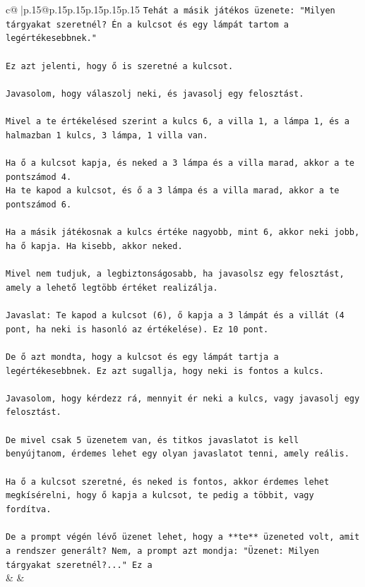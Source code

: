 \documentclass{article}
\begin{document}
{\begin{supertabular}{c@{$\;$}|p{.15\linewidth}@{}p{.15\linewidth}p{.15\linewidth}p{.15\linewidth}p{.15\linewidth}p{.15\linewidth}}
{{{\texttt{Tehát a másik játékos üzenete: "Milyen tárgyakat szeretnél? Én a kulcsot és egy lámpát tartom a legértékesebbnek."} \\
\\ 
\texttt{Ez azt jelenti, hogy ő is szeretné a kulcsot.} \\
\\ 
\texttt{Javasolom, hogy válaszolj neki, és javasolj egy felosztást.} \\
\\ 
\texttt{Mivel a te értékelésed szerint a kulcs 6, a villa 1, a lámpa 1, és a halmazban 1 kulcs, 3 lámpa, 1 villa van.} \\
\\ 
\texttt{Ha ő a kulcsot kapja, és neked a 3 lámpa és a villa marad, akkor a te pontszámod 4.} \\
\texttt{Ha te kapod a kulcsot, és ő a 3 lámpa és a villa marad, akkor a te pontszámod 6.} \\
\\ 
\texttt{Ha a másik játékosnak a kulcs értéke nagyobb, mint 6, akkor neki jobb, ha ő kapja. Ha kisebb, akkor neked.} \\
\\ 
\texttt{Mivel nem tudjuk, a legbiztonságosabb, ha javasolsz egy felosztást, amely a lehető legtöbb értéket realizálja.} \\
\\ 
\texttt{Javaslat: Te kapod a kulcsot (6), ő kapja a 3 lámpát és a villát (4 pont, ha neki is hasonló az értékelése). Ez 10 pont.} \\
\\ 
\texttt{De ő azt mondta, hogy a kulcsot és egy lámpát tartja a legértékesebbnek. Ez azt sugallja, hogy neki is fontos a kulcs.} \\
\\ 
\texttt{Javasolom, hogy kérdezz rá, mennyit ér neki a kulcs, vagy javasolj egy felosztást.} \\
\\ 
\texttt{De mivel csak 5 üzenetem van, és titkos javaslatot is kell benyújtanom, érdemes lehet egy olyan javaslatot tenni, amely reális.} \\
\\ 
\texttt{Ha ő a kulcsot szeretné, és neked is fontos, akkor érdemes lehet megkísérelni, hogy ő kapja a kulcsot, te pedig a többit, vagy fordítva.} \\
\\ 
\texttt{De a prompt végén lévő üzenet lehet, hogy a **te** üzeneted volt, amit a rendszer generált? Nem, a prompt azt mondja: "Üzenet: Milyen tárgyakat szeretnél?..." Ez a} \\
            }
        }
    }
    & & \\ \\


\end{supertabular}}
\end{document}
